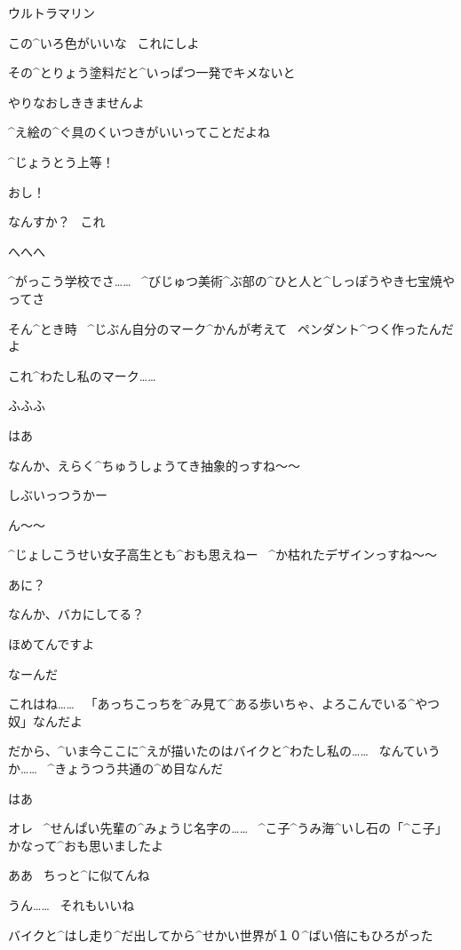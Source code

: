 \Sensei ウルトラマリン

\Sensei この^{いろ}{色}がいいな
\ これにしよ

\Ojisan その^{とりょう}{塗料}だと^{いっぱつ}{一発}でキメないと

\Ojisan やりなおしききませんよ

\Sensei ^{え}{絵}の^{ぐ}{具}のくいつきがいいってことだよね

\Sensei ^{じょうとう}{上等}！

\page
\Sensei おし！

\Ojisan なんすか？
\ これ

\Sensei へへへ

\Sensei ^{がっこう}{学校}でさ……
\ ^{びじゅつ}{美術}^{ぶ}{部}の^{ひと}{人}と^{しっぽうやき}{七宝焼}やってさ

\Sensei そん^{とき}{時}
\ ^{じぶん}{自分}のマーク^{かんが}{考}えて
\ ペンダント^{つく}{作}ったんだよ

\Sensei これ^{わたし}{私}のマーク……

\Sensei ふふふ

\Ojisan はあ

\page
\Ojisan なんか、えらく^{ちゅうしょうてき}{抽象的}っすね〜〜

\Ojisan しぶいっつうかー

\Ojisan ん〜〜

\Ojisan ^{じょしこうせい}{女子高生}とも^{おも}{思}えねー
\ ^{か}{枯}れたデザインっすね〜〜

\Sensei あに？

\Sensei なんか、バカにしてる？

\Ojisan ほめてんですよ

\Sensei なーんだ

\page
\Sensei これはね……
\ 「あっちこっちを^{み}{見}て^{ある}{歩}いちゃ、よろこんでいる^{やつ}{奴}」なんだよ

\Sensei だから、^{いま}{今}ここに^{えが}{描}いたのはバイクと^{わたし}{私}の……
\ なんていうか……
\ ^{きょうつう}{共通}の^{め}{目}なんだ

\Ojisan はあ

\page
\Ojisan オレ
\ ^{せんぱい}{先輩}の^{みょうじ}{名字}の……
\ ^{こ}{子}^{うみ}{海}^{いし}{石}の「^{こ}{子}」かなって^{おも}{思}いましたよ

\Sensei ああ
\ ちっと^{に}{似}てんね

\Sensei うん……
\ それもいいね

\page
\Sensei バイクと^{はし}{走}り^{だ}{出}してから^{せかい}{世界}が１０^{ばい}{倍}にもひろがった

